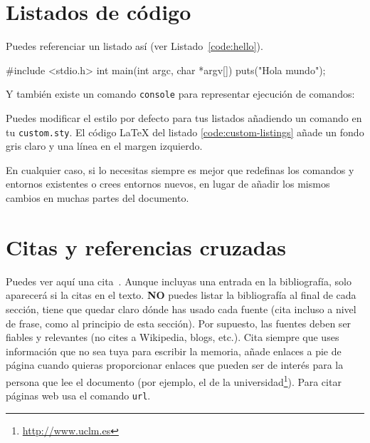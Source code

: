 \section{Listados de código}
\label{sec:listado}

\noindent
Puedes referenciar un listado así (ver Listado~\ref{code:hello}).

\begin{listing}[
  float=ht,
  language = C,
  caption  = {«Hola mundo» en C},
  label    = code:hello]
#include <stdio.h>
int main(int argc, char *argv[]) {
    puts("Hola mundo\n");
}
\end{listing}

Y también existe un comando \texttt{console} para representar ejecución de comandos:


Puedes modificar el estilo por defecto para tus listados añadiendo un comando  en tu \texttt{custom.sty}. El código \LaTeX{} del listado \ref{code:custom-listings} añade un fondo gris claro y una línea en el margen izquierdo.

\begin{listing}[
  float=h!,
  caption  = {Personalizando los listados de código},
  label    = code:custom-listings]
\end{listing}

En cualquier caso, si lo necesitas siempre es mejor que redefinas los comandos y entornos existentes o crees entornos nuevos, en lugar de añadir los mismos cambios en muchas partes del documento.


\section{Citas y referencias cruzadas}

Puedes ver aquí una cita~\cite{design_patterns}. Aunque incluyas una entrada en la bibliografía, solo aparecerá si la citas en el texto. \textbf{NO} puedes listar la bibliografía al final de cada sección, tiene que quedar claro dónde has usado cada fuente (cita incluso a nivel de frase, como al principio de esta sección). Por supuesto, las fuentes deben ser fiables y relevantes (no cites a Wikipedia, blogs, etc.). Cita siempre que uses información que no sea tuya para escribir la memoria, añade enlaces a pie de página cuando quieras proporcionar enlaces que pueden ser de interés para la persona que lee el documento (por ejemplo, el de la universidad\footnote{\url{http://www.uclm.es}}). Para citar páginas web usa el comando \texttt{url}.

